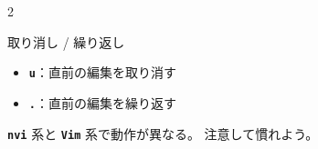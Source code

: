 \begin{multicols}{2}
\begin{cheatbox}{取り消し / 繰り返し}
\begin{itemize}
  \item \texttt{\bfseries u}：直前の編集を取り消す
  \item \texttt{\bfseries .}：直前の編集を繰り返す
\end{itemize}
\texttt{\bfseries nvi} 系と \texttt{\bfseries Vim} 系で動作が異なる。
注意して慣れよう。
\end{cheatbox}

\end{multicols}




